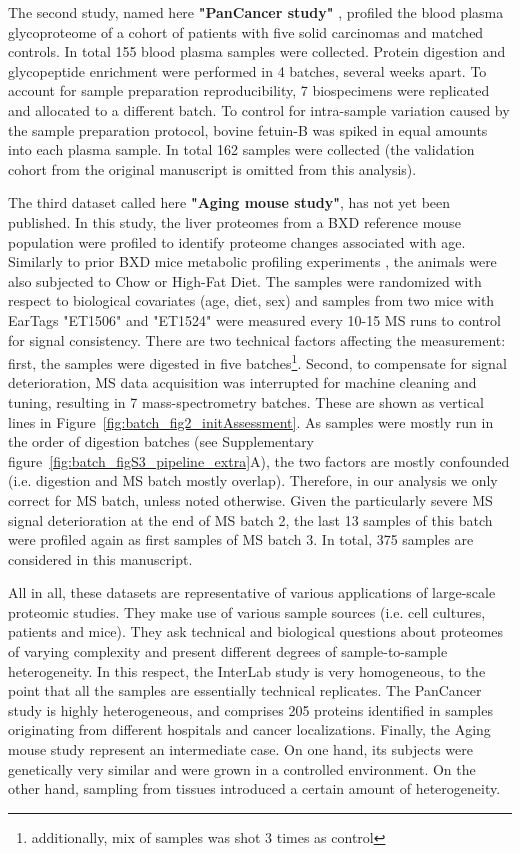 \documentclass[num-refs]{wiley-article}
\begin{document}
The second study, named here \textbf{"PanCancer study"} \cite{Sajic2018}, profiled the blood plasma glycoproteome of a cohort of patients with five solid carcinomas and matched controls. In total 155 blood plasma samples were collected. Protein digestion and glycopeptide enrichment were performed in 4 batches, several weeks apart. To account for sample preparation reproducibility, 7 biospecimens were replicated and allocated to a different batch. To control for intra-sample variation caused by the sample preparation protocol, bovine fetuin-B was spiked in equal amounts into each plasma sample. In total 162 samples were collected (the validation cohort from the original manuscript is omitted from this analysis).

The third dataset called here \textbf{"Aging mouse study"}, has not yet been published. In this study, the liver proteomes from a BXD reference mouse population \cite{Peirce:2004aa} were profiled to identify proteome changes associated with age. Similarly to prior BXD mice metabolic profiling experiments \cite{Williams:2016aa}, the animals were also subjected to Chow or High-Fat Diet. The samples were randomized with respect to biological covariates (age, diet, sex) and samples from two mice with EarTags "ET1506" and "ET1524" were measured every 10-15 MS runs to control for signal consistency. There are two technical factors affecting the measurement: first, the samples were digested in five batches\footnote{additionally, mix of samples was shot 3 times as control}. Second, to compensate for signal deterioration, MS data acquisition was interrupted for machine cleaning and tuning, resulting in 7 mass-spectrometry batches. These are shown as vertical lines in Figure~\ref{fig:batch_fig2_initAssessment}. As samples were mostly run in the order of digestion batches (see Supplementary figure~\ref{fig:batch_figS3_pipeline_extra}A), the two factors are mostly confounded (i.e. digestion and MS batch mostly overlap). Therefore, in our analysis we only correct for MS batch, unless noted otherwise. Given the particularly severe MS signal deterioration at the end of MS batch 2, the last 13 samples of this batch were profiled again as first samples of MS batch 3. In total, 375 samples are considered in this manuscript.

All in all, these datasets are representative of various applications of large-scale proteomic studies. They make use of various sample sources (i.e. cell cultures, patients and mice). They ask technical and biological questions about proteomes of varying complexity and present different degrees of sample-to-sample heterogeneity. In this respect, the InterLab study is very homogeneous, to the point that all the samples are essentially technical replicates. The PanCancer study is highly heterogeneous, and comprises 205 proteins identified in samples originating from different hospitals and cancer localizations. Finally, the Aging mouse study represent an intermediate case. On one hand, its subjects were genetically very similar and were grown in a controlled environment. On the other hand, sampling from tissues introduced a certain amount of heterogeneity.
\end{document}
